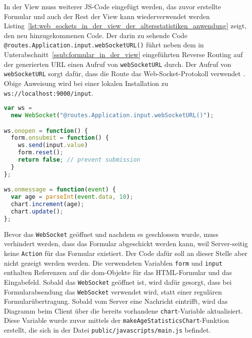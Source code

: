 In der View muss weiterer JS-Code eingefügt werden, das zuvor erstellte Formular und auch der Rest der View kann wiederverwendet werden
Listing~\ref{lst:web_sockets_in_der_view_der_altersstatistiken_anwendung} zeigt, den neu hinzugekommenen Code.
Der darin zu sehende Code \lstinline|@routes.Application.input.webSocketURL()| führt neben dem in Unterabschnitt~\ref{ssub:formular_in_der_view} eingeführten Reverse Routing auf der generierten URL einen Aufruf von \lstinline|webSocketURL| durch.
Der Aufruf von \lstinline|webSocketURL| sorgt dafür, dass die Route das Web-Socket-Protokoll verwendet \cite[vgl.][S.~281]{play_for_scala}.
Obige Anweisung wird bei einer lokalen Installation zu \lstinline[language=sh]|ws://localhost:9000/input|.

\begin{lstlisting}[language=javascript, caption=Web-Sockets in der View der Altersstatistiken-Anwendung, label=lst:web_sockets_in_der_view_der_altersstatistiken_anwendung]
var ws =
  new WebSocket("@routes.Application.input.webSocketURL()");

ws.onopen = function() {
  form.onsubmit = function() {
    ws.send(input.value)
    form.reset();
    return false; // prevent submission
  }
};

ws.onmessage = function(event) {
  var age = parseInt(event.data, 10);
  chart.increment(age);
  chart.update();
};
\end{lstlisting}

Bevor das \lstinline|WebSocket| geöffnet und nachdem es geschlossen wurde, muss verhindert werden, dass das Formular abgeschickt werden kann, weil Server-seitig keine \lstinline|Action| für das Formular existiert.
Der Code dafür soll an dieser Stelle aber nicht gezeigt werden werden.
Die verwendeten Variablen \lstinline|form| und \lstinline|input| enthalten Referenzen auf die \gls{dom}-Objekte für das HTML-Formular und das Eingabefeld.
Sobald das \lstinline|WebSocket| geöffnet ist, wird dafür gesorgt, dass bei Formularabsendung das \lstinline|WebSocket| verwendet wird, statt einer regulären Formularübertragung.
Sobald vom Server eine Nachricht eintrifft, wird das Diagramm beim Client über die bereits vorhandene \lstinline|chart|-Variable aktualisiert.
Diese Variable wurde zuvor mittels der \lstinline|makeAgeStatisticsChart|-Funktion erstellt, die sich in der Datei \lstinline|public/javascripts/main.js| befindet.



